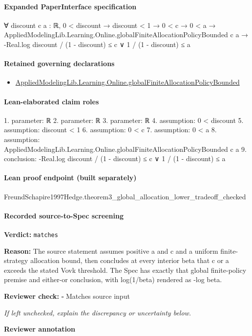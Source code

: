 \documentclass[10pt]{article}
\newcommand{\reviewerbox}{%
  \par\noindent\fbox{\parbox{0.96\linewidth}{\rule{0pt}{0.38in}}}\par
}
\newcommand{\reviewmatch}[1]{%
  \par\noindent\textbf{Reviewer check:} $\square$\; #1\par
  \noindent\emph{If left unchecked, explain the discrepancy or uncertainty below.}\par
}
\begin{document}
\paragraph{Expanded PaperInterface specification}
\begin{ReviewVerbatim}
∀ {discount c a : ℝ},
  0 < discount →
    discount < 1 →
      0 < c →
        0 < a →
          AppliedModelingLib.Learning.Online.globalFiniteAllocationPolicyBounded c a →
            -Real.log discount / (1 - discount) ≤ c ∨ 1 / (1 - discount) ≤ a
\end{ReviewVerbatim}

\paragraph{Retained governing declarations}
\begin{itemize}\raggedright
\item \hyperlink{governing-declaration-a3a701dc023da88b}{Applied\allowbreak{}Modeling\allowbreak{}Lib.\allowbreak{}Learning.\allowbreak{}Online.\allowbreak{}global\allowbreak{}Finite\allowbreak{}Allocation\allowbreak{}Policy\allowbreak{}Bounded}
\end{itemize}
\paragraph{Lean-elaborated claim roles}\begin{ReviewVerbatim}
1. parameter: ℝ
2. parameter: ℝ
3. parameter: ℝ
4. assumption: 0 < discount
5. assumption: discount < 1
6. assumption: 0 < c
7. assumption: 0 < a
8. assumption: AppliedModelingLib.Learning.Online.globalFiniteAllocationPolicyBounded c a
9. conclusion: -Real.log discount / (1 - discount) ≤ c ∨ 1 / (1 - discount) ≤ a
\end{ReviewVerbatim}

\paragraph{Lean proof endpoint (built separately)}\begin{ReviewVerbatim}
FreundSchapire1997Hedge.theorem3_global_allocation_lower_tradeoff_checked
\end{ReviewVerbatim}

\paragraph{Recorded source-to-Spec screening}
\textbf{Verdict:} \texttt{matches}
\\
{\raggedright
\textbf{Reason:} The source statement assumes positive a and c and a uniform finite-\allowbreak{}strategy allocation bound, then concludes at every interior beta that c or a exceeds the stated Vovk threshold.\allowbreak{} The Spec has exactly that global finite-\allowbreak{}policy premise and either-\allowbreak{}or conclusion, with log(1/\allowbreak{}beta) rendered as -\allowbreak{}log beta.\allowbreak{}
\par}
\reviewmatch{Matches source input}
\noindent\textbf{Reviewer annotation}\par
\reviewerbox
\clearpage
\hypertarget{source-claim-c391b7320b97c0f7}{}
\end{document}
